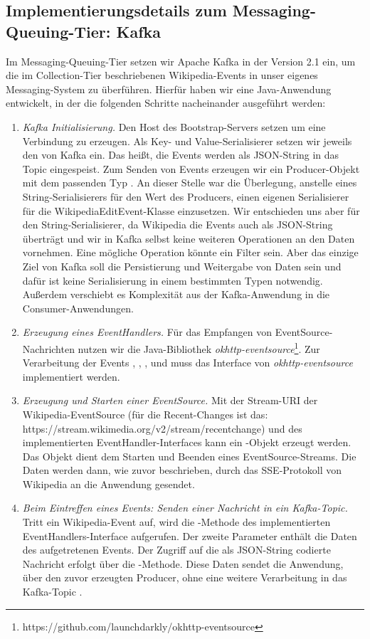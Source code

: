 \subsection{Implementierungsdetails zum Messaging-Queuing-Tier: Kafka}
Im Messaging-Queuing-Tier setzen wir Apache Kafka in der Version 2.1 ein, um die im Collection-Tier beschriebenen Wikipedia-Events
in unser eigenes Messaging-System zu überführen. Hierfür haben wir eine Java-Anwendung entwickelt, in der die folgenden
Schritte nacheinander ausgeführt werden:
\begin{enumerate}
    \item \textit{Kafka Initialisierung.} Den Host des Bootstrap-Servers setzen um eine Verbindung zu erzeugen.
    Als Key- und Value-Serialisierer setzen wir
    jeweils den  von Kafka ein. Das heißt, die Events werden als JSON-String in das Topic 
    eingespeist. Zum Senden von Events erzeugen wir ein Producer-Objekt mit dem passenden Typ .
    An dieser Stelle war die Überlegung, anstelle eines String-Serialisierers für den Wert des Producers,
    einen eigenen Serialisierer für die WikipediaEditEvent-Klasse einzusetzen. Wir entschieden uns aber für den
    String-Serialisierer, da Wikipedia die Events auch als JSON-String überträgt und wir in Kafka selbst
    keine weiteren Operationen an den Daten vornehmen. Eine mögliche Operation könnte ein Filter sein.
    Aber das einzige Ziel von Kafka soll die Persistierung und Weitergabe von Daten sein und dafür ist keine Serialisierung in
    einem bestimmten Typen notwendig. Außerdem verschiebt es Komplexität aus der Kafka-Anwendung
    in die Consumer-Anwendungen.
    \item \textit{Erzeugung eines EventHandlers.} Für das Empfangen von EventSource-Nachrichten nutzen wir die Java-Bibliothek
    \textit{okhttp-eventsource}\footnote{https://github.com/launchdarkly/okhttp-eventsource}. Zur Verarbeitung der Events
    , , ,  und  muss das Interface  von
    \textit{okhttp-eventsource} implementiert werden.
    \item \textit{Erzeugung und Starten einer EventSource.} Mit der Stream-URI der Wikipedia-EventSource (für die Recent-Changes ist das: https://stream.wikimedia.org/v2/stream/recentchange)
    und des implementierten EventHandler-Interfaces
    kann ein -Objekt erzeugt werden. Das Objekt dient dem Starten und Beenden eines EventSource-Streams.
    Die Daten werden dann, wie zuvor beschrieben, durch das SSE-Protokoll von Wikipedia an die Anwendung gesendet.
    \item \textit{Beim Eintreffen eines Events: Senden einer Nachricht in ein Kafka-Topic.} Tritt ein Wikipedia-Event auf,
    wird die -Methode des implementierten EventHandlers-Interface aufgerufen. Der zweite Parameter enthält die Daten
    des aufgetretenen Events. Der Zugriff auf die als JSON-String codierte Nachricht erfolgt über die -Methode.
    Diese Daten sendet die Anwendung, über den zuvor erzeugten Producer, ohne eine weitere
    Verarbeitung in das Kafka-Topic .
\end{enumerate}

